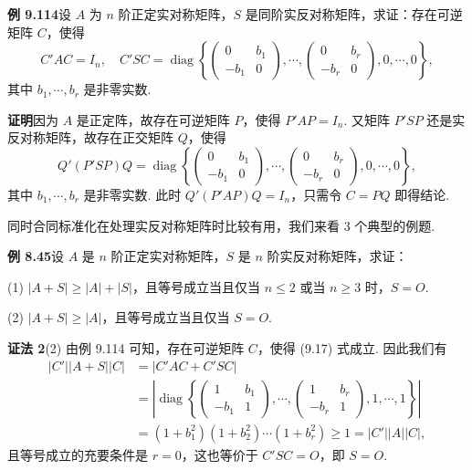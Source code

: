 \documentclass[UTF8, 12pt, fontset=fandol, oneside]{ctexart}
\begin{document}
\noindent\textbf{例 9.114}\quad 设 $A$ 为 $n$ 阶正定实对称矩阵，$S$ 是同阶实反对称矩阵，求证：存在可逆矩阵 $C$，使得
\begin{equation}
C'AC=I_n,\quad
C'SC=\operatorname{diag}\left\{
\begin{pmatrix}
0&b_1\\
-b_1&0
\end{pmatrix},\cdots,
\begin{pmatrix}
0&b_r\\
-b_r&0
\end{pmatrix},
0,\cdots,0
\right\},
\tag{9.17}
\end{equation}
其中 $b_1,\cdots,b_r$ 是非零实数.

\noindent\textbf{证明}\quad 因为 $A$ 是正定阵，故存在可逆矩阵 $P$，使得 $P'AP=I_n$. 又矩阵 $P'SP$ 还是实反对称矩阵，故存在正交矩阵 $Q$，使得
\[
Q'(P'SP)Q=\operatorname{diag}\left\{
\begin{pmatrix}
0&b_1\\
-b_1&0
\end{pmatrix},\cdots,
\begin{pmatrix}
0&b_r\\
-b_r&0
\end{pmatrix},
0,\cdots,0
\right\},
\]
其中 $b_1,\cdots,b_r$ 是非零实数. 此时 $Q'(P'AP)Q=I_n$，只需令 $C=PQ$ 即得结论.

同时合同标准化在处理实反对称矩阵时比较有用，我们来看 3 个典型的例题.

\noindent\textbf{例 8.45}\quad 设 $A$ 是 $n$ 阶正定实对称矩阵，$S$ 是 $n$ 阶实反对称矩阵，求证：

(1) $|A+S|\ge |A|+|S|$，且等号成立当且仅当 $n\le2$ 或当 $n\ge3$ 时，$S=O$.

(2) $|A+S|\ge |A|$，且等号成立当且仅当 $S=O$.

\noindent\textbf{证法 2}\quad (2) 由例 9.114 可知，存在可逆矩阵 $C$，使得 (9.17) 式成立. 因此我们有
\[
\begin{aligned}
|C'||A+S||C|
&=|C'AC+C'SC|\\
&=\left|\operatorname{diag}\left\{
\begin{pmatrix}
1&b_1\\
-b_1&1
\end{pmatrix},\cdots,
\begin{pmatrix}
1&b_r\\
-b_r&1
\end{pmatrix},
1,\cdots,1
\right\}\right|\\
&=(1+b_1^2)(1+b_2^2)\cdots(1+b_r^2)\ge1=|C'||A||C|,
\end{aligned}
\]
且等号成立的充要条件是 $r=0$，这也等价于 $C'SC=O$，即 $S=O$.
\end{document}
